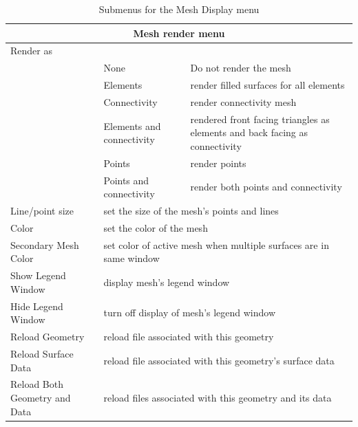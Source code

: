 \begin{table}[ht]
\caption{Submenus for the Mesh Display menu}
  \begin{center}
    \begin{tabular}{|p{1in}|p{2in}|p{2.5in}|} \hline
      \multicolumn{3}{|c|}{\textbf{Mesh render menu}} \\ \hline
    Render as & & \\
      &  None & Do not render the mesh \\
      &  Elements  & render filled surfaces for all elements \\
      &  Connectivity & render connectivity mesh\\ 
      &  Elements and connectivity & rendered front facing triangles as
            elements and back facing as connectivity \\ 
      &  Points & render points \\ 
      &  Points and connectivity & render both points and connectivity \\ 
      \hline
    Line/point size 
      & \multicolumn{2}{|l|}{set the size of the mesh's points and lines}\\
    \hline 
    Color 
      & \multicolumn{2}{|l|}{set the color of the mesh}\\ \hline
    Secondary Mesh Color
      & \multicolumn{2}{|l|}{set color of active mesh when multiple 
        surfaces are in same window} \\ \hline
    Show Legend Window
      & \multicolumn{2}{|l|}{display mesh's legend window}\\ \hline
    Hide Legend Window
      & \multicolumn{2}{|l|}{turn off display of mesh's legend window}\\ \hline
    Reload Geometry
      & \multicolumn{2}{|l|}{reload file associated with this geometry}\\
    \hline 
    Reload Surface Data
      & \multicolumn{2}{|l|}{reload file associated with this geometry's
    surface data}\\ \hline 
    Reload Both Geometry and Data
      & \multicolumn{2}{|l|}{reload files associated with this geometry and
    its data}\\ \hline 

    \end{tabular}
  \end{center}
\end{table}

